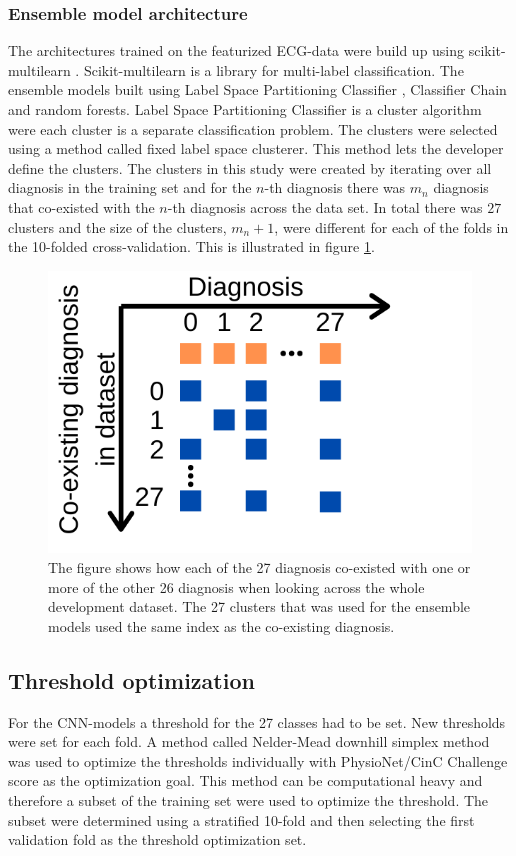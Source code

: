 \subsubsection{Ensemble model architecture}\hfill \break
The architectures trained on the featurized ECG-data were build up using scikit-multilearn \cite{szymanski_scikit-multilearn_2019}. Scikit-multilearn is a library for multi-label classification. The ensemble models built using Label Space Partitioning Classifier \cite{szymanski_how_2016}, Classifier Chain \cite{read_classifier_2009} and random forests. Label Space Partitioning Classifier is a cluster algorithm were each cluster is a separate classification problem. The clusters were selected using a method called fixed label space clusterer. This method lets the developer define the clusters. The clusters in this study were created by iterating over all diagnosis in the training set and for the $n$-th diagnosis there was $m_n$ diagnosis that co-existed with the $n$-th diagnosis across the data set. In total there was $27$ clusters and the size of the clusters, $m_n + 1$, were different for each of the folds in the 10-folded cross-validation. This is illustrated in figure \ref{fig:diagnosis_co_exist}.

\begin{figure}[!hbp]
    \centering
    \includegraphics[width=.6\textwidth]{Figures/Diagnosis_cluster_axis.png}
    \caption{The figure shows how each of the 27 diagnosis co-existed with one or more of the other 26 diagnosis when looking across the whole development dataset. The 27 clusters that was used for the ensemble models used the same index as the co-existing diagnosis.}
    \label{fig:diagnosis_co_exist}
\end{figure}



\subsection{Threshold optimization}
For the CNN-models a threshold for the 27 classes had to be set. New thresholds were set for each fold. A method called Nelder-Mead downhill simplex method \cite{nelder_simplex_1965, virtanen_scipy_2020} was used to optimize the thresholds individually with PhysioNet/CinC Challenge score as the optimization goal. This method can be computational heavy and therefore a subset of the training set were used to optimize the threshold. The subset were determined using a stratified 10-fold and then selecting the first validation fold as the threshold optimization set.

